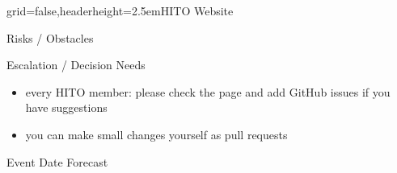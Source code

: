 \documentclass[english]{kiesgrube}
\begin{document}
\begin{poster}{grid=false,headerheight=2.5em}{}{HITO Website}{}{}
\begin{posterbox}[name=risks,column=1,below=open]{Risks / Obstacles}
\begin{itemize}
\end{itemize}
\end{posterbox}
\begin{posterbox}[name=escalation,column=1,below=risks]{Escalation / Decision Needs}
\begin{itemize}
\item every HITO member: please check the page and add GitHub issues if you have suggestions  
\item you can make small changes yourself as pull requests
\end{itemize}
\end{posterbox}
\begin{posterbox}[name=event,below=description,]{Event Date Forecast}
\end{posterbox}
\footer{}
\end{poster}

\newpage
\end{document}
